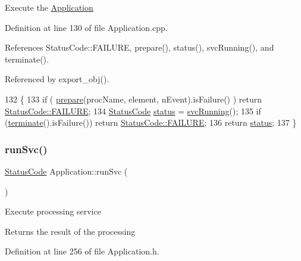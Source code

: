 Execute the \hyperlink{classApplication}{Application} 

Definition at line 130 of file Application.\+cpp.



References Status\+Code\+::\+F\+A\+I\+L\+U\+RE, prepare(), status(), svc\+Running(), and terminate().



Referenced by export\+\_\+obj().


\begin{DoxyCode}
132                                            \{
133   \textcolor{keywordflow}{if} ( \hyperlink{classApplication_a61dcc20b7f4b7c19b697db7516a62afa}{prepare}(procName, element, nEvent).isFailure() ) \textcolor{keywordflow}{return} 
      \hyperlink{classStatusCode_a6f565cbeadc76d14c72f047e5e85eb4ba3da73d4c469762eb9d3c960368252b26}{StatusCode::FAILURE};
134   \hyperlink{classStatusCode}{StatusCode} \hyperlink{classApplication_ad429c4d2322f706e3564c1ee05d38ff1}{status} = \hyperlink{classApplication_a35eca6b5e618b508a0736d032e2a9203}{svcRunning}();
135   \textcolor{keywordflow}{if} (\hyperlink{classApplication_a1a36a06d48d94a9a8fdc29a77d2cb9f0}{terminate}().isFailure()) \textcolor{keywordflow}{return} \hyperlink{classStatusCode_a6f565cbeadc76d14c72f047e5e85eb4ba3da73d4c469762eb9d3c960368252b26}{StatusCode::FAILURE};
136   \textcolor{keywordflow}{return} \hyperlink{classApplication_ad429c4d2322f706e3564c1ee05d38ff1}{status};
137 \}
\end{DoxyCode}
\mbox{\label{classApplication_abfbf40397efe6ff0627d2ce1a55381ce}} 
\subsubsection{\texorpdfstring{run\+Svc()}{runSvc()}}
{\footnotesize\ttfamily \hyperlink{classStatusCode}{Status\+Code} Application\+::run\+Svc (\begin{DoxyParamCaption}{ }\end{DoxyParamCaption})\hspace{0.3cm}{\ttfamily [inline]}}

Execute processing service \begin{DoxyReturn}{Returns}
the result of the processing 
\end{DoxyReturn}


Definition at line 256 of file Application.\+h.


